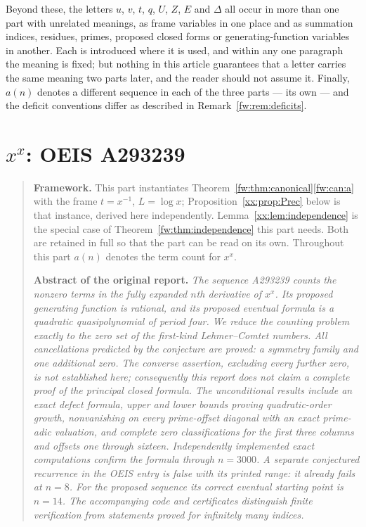 \documentclass[11pt,a4paper]{article}
\numberwithin{equation}{section}
\theoremstyle{definition}
\theoremstyle{remark}
\theoremstyle{plain}
\begin{document}
\noindent
Beyond these, the letters $u$, $v$, $t$, $q$, $U$, $Z$, $E$ and $\Delta$ all
occur in more than one part with unrelated meanings, as frame variables in one
place and as summation indices, residues, primes, proposed closed forms or
generating-function variables in another.  Each is introduced where it is used,
and within any one paragraph the meaning is fixed; but nothing in this article
guarantees that a letter carries the same meaning two parts later, and the
reader should not assume it.  Finally, $a(n)$ denotes a different sequence in
each of the three parts --- its own --- and the deficit conventions differ as
described in Remark~\ref{fw:rem:deficits}.

\clearpage
\section{\texorpdfstring{$x^x$}{x^x}: OEIS A293239}\label{xx:part}

\begin{quote}\small
\textbf{Framework.}  This part instantiates
Theorem~\ref{fw:thm:canonical}\ref{fw:can:a} with the frame $t=x^{-1}$,
$L=\log x$; Proposition~\ref{xx:prop:Prec} below is that instance, derived here
independently.  Lemma~\ref{xx:lem:independence} is the special case of
Theorem~\ref{fw:thm:independence} this part needs.  Both are retained in full so
that the part can be read on its own.  Throughout this part $a(n)$ denotes the
term count for $x^x$.

\medskip
\textbf{Abstract of the original report.}\itshape
The sequence A293239 counts the nonzero terms in the fully expanded $n$th
derivative of $x^x$. Its proposed generating function is rational, and its
proposed eventual formula is a quadratic quasipolynomial of period four.
We reduce the counting problem exactly to the zero set of the first-kind
Lehmer--Comtet numbers. All cancellations predicted by the conjecture are
proved: a symmetry family and one additional zero. The converse assertion,
excluding every further zero, is not established here; consequently this
report does \upshape\emph{not}\itshape{} claim a complete proof of the principal
closed formula.
The unconditional results include an exact defect formula, upper and lower
bounds proving quadratic-order growth, nonvanishing on every prime-offset
diagonal with an exact prime-adic valuation, and complete zero classifications
for the first three columns and offsets one through sixteen. Independently
implemented exact computations confirm the formula through $n=3000$.
A separate conjectured recurrence in the OEIS entry is false with its printed
range: it already fails at $n=8$. For the proposed sequence its correct
eventual starting point is $n=14$. The accompanying code and certificates
distinguish finite verification from statements proved for infinitely many
indices.
\end{quote}
\end{document}
